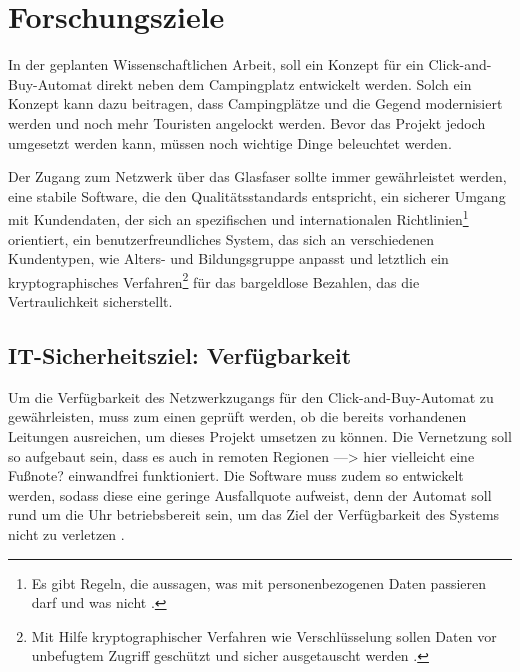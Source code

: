 \section{Forschungsziele}


In der geplanten Wissenschaftlichen Arbeit, soll ein Konzept für ein Click-and-Buy-Automat direkt neben
dem Campingplatz entwickelt werden. Solch ein Konzept kann dazu beitragen, dass Campingplätze und die Gegend
modernisiert werden und noch mehr Touristen angelockt werden. Bevor das Projekt jedoch umgesetzt werden kann, 
müssen noch wichtige Dinge beleuchtet werden. 


Der Zugang zum Netzwerk über das Glasfaser sollte immer gewährleistet
werden, eine stabile Software, die den Qualitätsstandards entspricht, ein sicherer Umgang mit Kundendaten, 
der sich an spezifischen und internationalen Richtlinien\footnote{Es gibt Regeln, die aussagen, 
was mit personenbezogenen Daten passieren darf und was nicht \cite{refart:DSDS}.} orientiert, ein benutzerfreundliches
System, das sich an verschiedenen Kundentypen, wie Alters- und Bildungsgruppe anpasst und letztlich ein 
kryptographisches Verfahren\footnote{Mit Hilfe kryptographischer Verfahren wie Verschlüsselung sollen
Daten vor unbefugtem Zugriff geschützt und sicher ausgetauscht werden \cite{refart:SLWK}.} für das bargeldlose 
Bezahlen, das die Vertraulichkeit sicherstellt.


\subsection{IT-Sicherheitsziel: Verfügbarkeit}
Um die Verfügbarkeit des Netzwerkzugangs für den Click-and-Buy-Automat zu gewährleisten, muss zum einen 
geprüft werden, ob die bereits vorhandenen Leitungen ausreichen, um dieses Projekt umsetzen zu können.
Die Vernetzung soll so aufgebaut sein, dass es auch in remoten Regionen ---> hier vielleicht eine Fußnote?
einwandfrei funktioniert. 
Die Software muss zudem so entwickelt werden, sodass diese eine geringe Ausfallquote aufweist, 
denn der Automat soll rund um die Uhr betriebsbereit sein, um das Ziel der Verfügbarkeit des
Systems nicht zu verletzen \cite{refbook:SWIS}.

